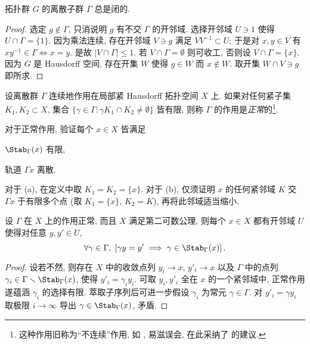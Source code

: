 \begin{lemma}\label{prop:discrete-closed}
	拓扑群 $G$ 的离散子群 $\Gamma$ 总是闭的.
\end{lemma}
\begin{proof}
	选定 $g \notin \Gamma$, 只消说明 $g$ 有不交 $\Gamma$ 的开邻域. 选择开邻域 $U \ni 1$ 使得 $U \cap \Gamma = \{1\}$. 因为乘法连续, 存在开邻域 $V \ni g$ 满足 $VV^{-1} \subset U$; 于是对 $x,y \in V$ 有 $xy^{-1} \in \Gamma \iff x=y$. 是故 $|V \cap \Gamma| \leq 1$. 若 $V \cap \Gamma = \emptyset$ 则可收工, 否则设 $V \cap \Gamma = \{x\}$. 因为 $G$ 是 Hausdorff 空间, 存在开集 $W$ 使得 $g \in W$ 而 $x \notin W$. 取开集 $W \cap V \ni g$ 即所求.
\end{proof}

\begin{definition}\label{def:discontinuous-action} 
	设离散群 $\Gamma$ 连续地作用在局部紧 Hausdorff 拓扑空间 $X$ 上. 如果对任何紧子集 $K_1, K_2 \subset X$, 集合 $\{\gamma \in \Gamma : \gamma K_1 \cap K_2 \neq \emptyset \}$ 皆有限, 则称 $\Gamma$ 的作用是\emph{正常}的\footnote{这种作用旧称为``不连续''作用, 如 \cite[p.18]{Bu97}, 易滋误会, 在此采纳了 \cite[\S 21]{Lee13} 的建议.}.
\end{definition}

\begin{exercise}
	对于正常作用, 验证每个 $x \in X$ 皆满足
	\begin{inparaenum}[(a)]
		\item $\Stab_\Gamma(x)$ 有限,
		\item 轨道 $\Gamma x$ 离散.
	\end{inparaenum}
	\begin{hint}
		对于 (a), 在定义中取 $K_1 = K_2 = \{x\}$. 对于 (b), 仅须证明 $x$ 的任何紧邻域 $K$ 交 $\Gamma x$ 于有限多个点 (取 $K_1 = \{x\}$, $K_2 = K$), 再将此邻域适当缩小.
	\end{hint}
\end{exercise}

\begin{proposition}\label{prop:nbhd-normal-action}
	设 $\Gamma$ 在 $X$ 上的作用正常, 而且 $X$ 满足第二可数公理, 则每个 $x \in X$ 都有开邻域 $U$ 使得对任意 $y, y' \in U$,
	\[ \forall \gamma \in \Gamma, \; \left[ \gamma y = y' \implies \gamma \in \Stab_\Gamma(x) \right]. \]
\end{proposition}
\begin{proof}
	设若不然, 则存在 $X$ 中的收敛点列 $y_i \to x$, $y'_i \to x$ 以及 $\Gamma$ 中的点列 $\gamma_i \in \Gamma \smallsetminus \Stab_\Gamma(x)$, 使得 $y'_i = \gamma_i y_i$. 可取 $y_i, y'_i$ 全在 $x$ 的一个紧邻域中, 正常作用遂蕴涵 $\gamma_i$ 的选择有限. 萃取子序列后可进一步假设 $\gamma_i$ 为常元 $\gamma \in \Gamma$. 对 $y'_i = \gamma y_i$ 取极限 $i \to \infty$ 导出 $\gamma \in \Stab_\Gamma(x)$, 矛盾.
\end{proof}

